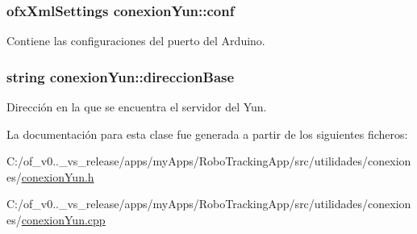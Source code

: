 \subsubsection[{conf}]{\setlength{\rightskip}{0pt plus 5cm}ofx\+Xml\+Settings conexion\+Yun\+::conf\hspace{0.3cm}{\ttfamily [private]}}\label{classconexion_yun_a18a59e3f193febe142a087cc6d8d6259}


Contiene las configuraciones del puerto del Arduino. 

\hypertarget{classconexion_yun_a120483618dae395e425290a6fbc669f6}{}
\subsubsection[{direccion\+Base}]{\setlength{\rightskip}{0pt plus 5cm}string conexion\+Yun\+::direccion\+Base\hspace{0.3cm}{\ttfamily [private]}}\label{classconexion_yun_a120483618dae395e425290a6fbc669f6}


Dirección en la que se encuentra el servidor del Yun. 



La documentación para esta clase fue generada a partir de los siguientes ficheros\+:\begin{DoxyCompactItemize}
\item 
C\+:/of\+\_\+v0..\+\_\+vs\+\_\+release/apps/my\+Apps/\+Robo\+Tracking\+App/src/utilidades/conexiones/\hyperlink{conexion_yun_8h}{conexion\+Yun.\+h}\item 
C\+:/of\+\_\+v0..\+\_\+vs\+\_\+release/apps/my\+Apps/\+Robo\+Tracking\+App/src/utilidades/conexiones/\hyperlink{conexion_yun_8cpp}{conexion\+Yun.\+cpp}\end{DoxyCompactItemize}

